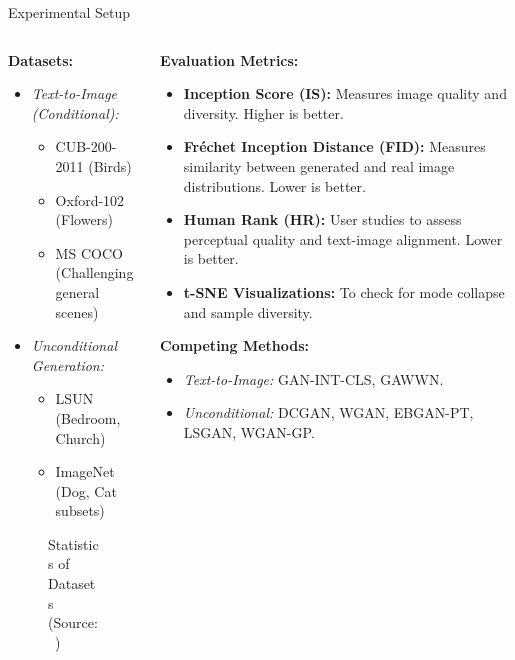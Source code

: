 \documentclass{beamer}
\newcommand{\papertable}[3][width=\textwidth]{%
    \begin{figure}%
        \centering%
        \caption{#3 (Source:~\cite{stackgan++})}%
        \label{tab:#2}%
    \end{figure}%
}
\begin{document}
\begin{frame}{Experimental Setup}
    \begin{columns}[T]
        \begin{column}{0.5\textwidth}
            \textbf{Datasets:}
            \begin{itemize}
                \item \textit{Text-to-Image (Conditional):}
                    \begin{itemize}
                        \item CUB-200-2011 (Birds)
                        \item Oxford-102 (Flowers)
                        \item MS COCO (Challenging general scenes)
                    \end{itemize}
                \item \textit{Unconditional Generation:}
                    \begin{itemize}
                        \item LSUN (Bedroom, Church)
                        \item ImageNet (Dog, Cat subsets)
                    \end{itemize}
            \end{itemize}
            \papertable[width=0.9\textwidth]{table1_datasets}{Statistics of Datasets}
        \end{column}
        \begin{column}{0.5\textwidth}
            \textbf{Evaluation Metrics:}
            \begin{itemize}
                \item \textbf{Inception Score (IS):} Measures image quality and diversity. Higher is better.
                \item \textbf{Fréchet Inception Distance (FID):} Measures similarity between generated and real image distributions. Lower is better.
                \item \textbf{Human Rank (HR):} User studies to assess perceptual quality and text-image alignment. Lower is better.
                \item \textbf{t-SNE Visualizations:} To check for mode collapse and sample diversity.
            \end{itemize}
            \textbf{Competing Methods:}
            \begin{itemize}
                \item \textit{Text-to-Image:} GAN-INT-CLS, GAWWN.
                \item \textit{Unconditional:} DCGAN, WGAN, EBGAN-PT, LSGAN, WGAN-GP.
            \end{itemize}
        \end{column}
    \end{columns}
\end{frame}
\end{document}
